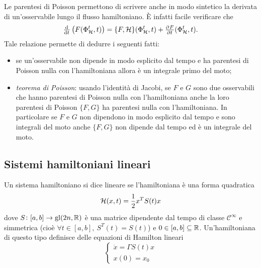 Le parentesi di Poisson permettono di scrivere anche in modo sintetico la derivata di un'osservabile lungo il flusso hamiltoniano. È infatti facile verificare che
\begin{equation}
    \od{}{t} \left(F(\Phi_\ham^t, t)\right) = \{F, \ham\}(\Phi_\ham^t, t) + \pd{F}{t}(\Phi_\ham^t, t).
\end{equation}
Tale relazione permette di dedurre i seguenti fatti:
\begin{itemize}
    \item se un'osservabile non dipende in modo esplicito dal tempo e ha parentesi di Poisson nulla con l'hamiltoniana allora è un integrale primo del moto;
    \item \emph{teorema di Poisson}: usando l'identità di Jacobi, se $ F $ e $ G $ sono due osservabili che hanno parentesi di Poisson nulla con l'hamiltoniana anche la loro parentesi di Poisson $ \{F, G\} $ ha parentesi nulla con l'hamiltoniana. In particolare se $ F $ e $ G $ non dipendono in modo esplicito dal tempo e sono integrali del moto anche $ \{F, G\} $ non dipende dal tempo ed è un integrale del moto.
\end{itemize}

\subsection{Sistemi hamiltoniani lineari}

\begin{definition}
    Un sistema hamiltoniano si dice lineare se l'hamiltoniana è una forma quadratica
    \begin{equation}
        \mathcal{H}(x, t) = \frac{1}{2} x^T S(t) x
    \end{equation}
    dove $ S \colon [a, b] \to \mathrm{gl}(2n, \mathbb{R}) $ è una matrice dipendente dal tempo di classe $ \mathcal{C}^\infty $ e simmetrica (cioè $ \forall t \in [a, b], \ S^T(t) = S(t) $) e $ 0 \in [a, b] \subseteq \mathbb{R} $. Un'hamiltoniana di questo tipo definisce delle equazioni di Hamilton lineari
    \begin{equation} \label{eqn:ham-lineare}
        \begin{cases}
            \dot{x} = \Gamma S(t) x \\
            x(0) = x_0
        \end{cases}
    \end{equation}
\end{definition}
\ \\

